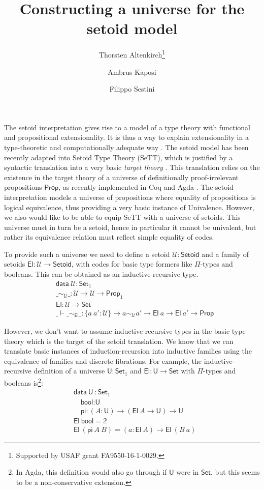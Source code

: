 \documentclass{easychair}
\title{Constructing a universe for the setoid model}
\author{Thorsten Altenkirch\inst{1}\thanks{Supported by USAF grant
    FA9550-16-1-0029.} \and Ambrus Kaposi \inst{2} \and Filippo Sestini\inst{1}}
\institute{
  School of Computer Science, University of Nottingham, UK\\
  \email{\{psztxa,psxfs5\}@nottingham.ac.uk}
  \and
  E{\"o}tv{\"o}s Lor{\'a}nd University, Budapest, Hungary\\
  \email{akaposi@inf.elte.hu}
}
\newcommand{\setoidU}{\mathcal{U}}
\newcommand{\Set}{\textsf{Set}}
\newcommand{\Prop}{\textsf{Prop}}
\newcommand{\Setoid}{\textsf{Setoid}}
\newcommand{\U}{\textsf{U}}
\newcommand{\El}{\textsf{El}}
\providecommand\mathbbm{\mathbb}
\begin{document}
\maketitle

The setoid interpretation gives rise to a model of a type theory with functional
and propositional extensionality. It is thus a way to explain extensionality in
a type-theoretic and computationally adequate way \cite{setoid-model}. The
setoid model has been recently adapted into Setoid Type Theory (SeTT), which is
justified by a syntactic translation into a very basic \emph{target theory}
\cite{mpc19}. This translation relies on the existence in the target theory of a
universe of definitionally proof-irrelevant propositions $\Prop$, as recently
implemented in Coq and Agda \cite{gilbert}. The setoid interpretation models a
universe of propositions where equality of propositions is logical equivalence,
thus providing a very basic instance of Univalence. However, we also would like
to be able to equip SeTT with a universe of setoids. This universe must in turn
be a setoid, hence in particular it cannot be univalent, but rather its
equivalence relation must reflect simple equality of codes.

To provide such a universe we need to define a setoid $\setoidU : \Setoid$ and a
family of setoids $\El : \setoidU \to \Setoid$, with codes for basic type
formers like $\Pi$-types and booleans. This can be obtained as an inductive-recursive type.
%
\begin{align*}
  & \textsf{data} \ \setoidU : \Set_1 \\
  & \_\sim_\setoidU\_ : \setoidU \to \setoidU \to \Prop_1 \\
  & \El : \setoidU \to \Set \\
  & \_\vdash\_\sim_\El\_ : \{a\ a' : \setoidU\} \to a \sim_\setoidU a' \to \El\ a \to \El\ a' \to \Prop
\end{align*}

However, we don't want to assume inductive-recursive types in the basic type
theory which is the target of the setoid translation. We know that we can translate
basic instances of induction-recursion into inductive families using the
equivalence of families and discrete fibrations. For example, the
inductive-recursive definition of a universe $\U:\Set_1$ and $\El : \U \to
\Set$ with $\Pi$-types and booleans is\footnote{In Agda, this definition would also go through if $\U$ were in $\Set$, but
  this seems to be a non-conservative extension.}:
%
\begin{align*}
  & \textsf{data}\ \U\ : \Set_1 \\
  & \quad \textsf{bool} : \U \\
  & \quad \textsf{pi} : (A : \U) \to (\El\ A \to \U) \to \U \\
  & \El\ \textsf{bool} = \mathbbm{2} \\
  & \El\ (\textsf{pi}\ A\ B) = (a : \El\ A) \to \El\ (B\ a)
\end{align*}
\end{document}
